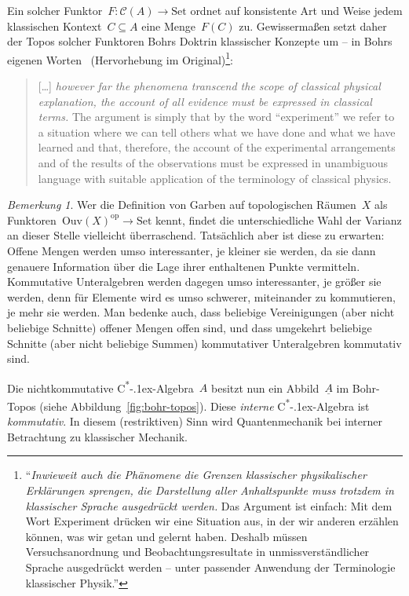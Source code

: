 \documentclass[a4paper,ngerman,12pt]{scrartcl}
\theoremstyle{definition}
\theoremstyle{plain}
\theoremstyle{remark}
\newtheorem{bem}[defn]{Bemerkung}
\newcommand{\C}{\mathcal{C}}
\newcommand{\Ouv}{\mathrm{Ouv}}
\newcommand{\ul}[1]{\underline{#1}}
\newcommand{\csalgebra}{C\textsuperscript{*}\kern-.1ex-Algebra}
\newcommand{\op}{\mathrm{op}}
\newcommand{\Set}{\mathrm{Set}}
\renewcommand{\_}{\mathpunct{.}\,}
\newcommand{\?}{\,{:}\,}
\begin{document}
Ein solcher Funktor~$F : \C(A) \to \Set$ ordnet auf konsistente Art und Weise
jedem klassischen Kontext~$C \subseteq A$ eine Menge~$F(C)$ zu. Gewissermaßen
setzt daher der Topos solcher Funktoren Bohrs Doktrin klassischer Konzepte um
-- in Bohrs eigenen Worten~\cite[Seite~209]{bohr} (Hervorhebung im
Original)\footnote{"`\emph{Inwieweit auch
die Phänomene die Grenzen klassischer physikalischer
Erklärungen sprengen, die Darstellung aller Anhaltspunkte muss trotzdem
in klassischer Sprache ausgedrückt werden.} Das Argument ist einfach:
Mit dem Wort \glq Experiment\grq{} drücken wir eine Situation aus, in der wir
anderen erzählen können, was wir getan und gelernt haben. Deshalb müssen
Versuchsanordnung und Beobachtungsresultate in
unmissverständlicher Sprache ausgedrückt werden -- unter passender
Anwendung der Terminologie klassischer Physik."'}:
\begin{quote}
[\ldots] \emph{however far the phenomena transcend the scope of classical physical
explanation, the account of all evidence must be expressed in
classical terms.} The argument is simply that by the word ``experiment''
we refer to a situation where we can tell others what we
have done and what we have learned and that, therefore, the account of
the experimental arrangements and of the results of the observations
must be expressed in unambiguous language with suitable application of
the terminology of classical physics.
\end{quote}

\begin{bem}Wer die Definition von Garben auf topologischen Räumen~$X$ als
Funktoren~$\Ouv(X)^\op \to \Set$
kennt, findet die unterschiedliche Wahl der Varianz an dieser Stelle vielleicht
überraschend. Tatsächlich aber ist diese zu erwarten: Offene Mengen werden umso
interessanter, je kleiner sie werden, da sie dann genauere Information über die
Lage ihrer enthaltenen Punkte vermitteln. Kommutative Unteralgebren werden
dagegen umso interessanter, je größer sie werden, denn für Elemente wird
es umso schwerer, miteinander zu kommutieren, je mehr sie werden. Man bedenke auch, dass
beliebige Vereinigungen (aber nicht beliebige Schnitte) offener Mengen offen
sind, und dass umgekehrt beliebige Schnitte (aber nicht beliebige
Summen) kommutativer Unteralgebren kommutativ sind.\end{bem}

Die nichtkommutative \csalgebra~$A$ besitzt nun ein Abbild~$\ul{A}$ im
Bohr-Topos (siehe Abbildung~\ref{fig:bohr-topos}). Diese \emph{interne}
\csalgebra{} ist \emph{kommutativ}. In diesem
(restriktiven) Sinn wird Quantenmechanik bei interner Betrachtung zu klassischer
Mechanik.
\end{document}
